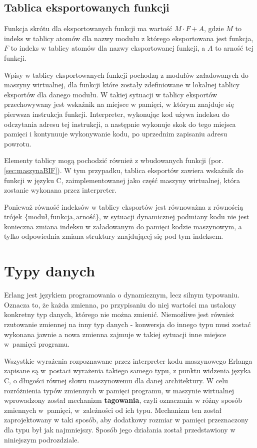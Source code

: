 \subsection{Tablica eksportowanych funkcji}
\label{sub:maszynaTablicaEksportow}

Funkcja skrótu dla eksportowanych funkcji ma wartość $M \cdot F+A$, gdzie $M$ to indeks w tablicy atomów dla nazwy modułu z którego eksportowana jest funkcja, $F$ to indeks w tablicy atomów dla nazwy eksportowanej funkcji, a $A$ to arność tej funkcji.

Wpisy w tablicy eksportowanych funkcji pochodzą z modułów załadowanych do maszyny wirtualnej, dla funkcji które zostały zdefiniowane w lokalnej tablicy eksportów dla danego modułu. W takiej sytuacji w tablicy eksportów przechowywany jest wskaźnik na miejsce w pamięci, w którym znajduje się pierwsza instrukcja funkcji. Interpreter, wykonując kod używa indeksu do odczytania adresu tej instrukcji, a następnie wykonuje skok do tego miejsca pamięci i kontynuuje wykonywanie kodu, po uprzednim zapisaniu adresu powrotu.

Elementy tablicy mogą pochodzić również z wbudowanych funkcji (por. \ref{sec:maszynaBIF}). W tym przypadku, tablica eksportów zawiera wskaźnik do funkcji w języku C, zaimplementowanej jako część maszyny wirtualnej, która zostanie wykonana przez interpreter.

Ponieważ równość indeksów w tablicy eksportów jest równoważna z równością trójek $\lbrace\text{moduł},\text{funkcja},\text{arność}\rbrace$, w sytuacji dynamicznej podmiany kodu nie jest konieczna zmiana indeksu w załadowanym do pamięci kodzie maszynowym, a tylko odpowiednia zmiana struktury znajdującej się pod tym indeksem.

\section{Typy danych}
\label{sec:maszynaTypy}

Erlang jest językiem programowania o dynamicznym, lecz silnym typowaniu. Oznacza to, że każda zmienna, po przypisaniu do niej wartości ma ustalony konkretny typ danych, którego nie można zmienić. Niemożliwe jest również rzutowanie zmiennej na inny typ danych - konwersja do innego typu musi zostać wykonana jawnie a nowa zmienna zajmuje w takiej sytuacji inne miejsce w~pamięci programu.

Wszystkie wyrażenia rozpoznawane przez interpreter kodu maszynowego Erlanga zapisane są w~postaci wyrażenia takiego samego typu, z punktu widzenia języka C, o długości równej słowu maszynowemu dla danej architektury.
W celu rozróżnienia typów zmiennych w pamięci programu, w maszynie wirtualnej wprowadzony został mechanizm \textbf{tagowania}, czyli oznaczania w różny sposób zmiennych w~pamięci, w~zależności od ich typu. Mechanizm ten został zaprojektowany w taki sposób, aby dodatkowy rozmiar w pamięci przeznaczony dla typu był jak najmniejszy. Sposób jego działania został przedstawiony w niniejszym podrozdziale.

